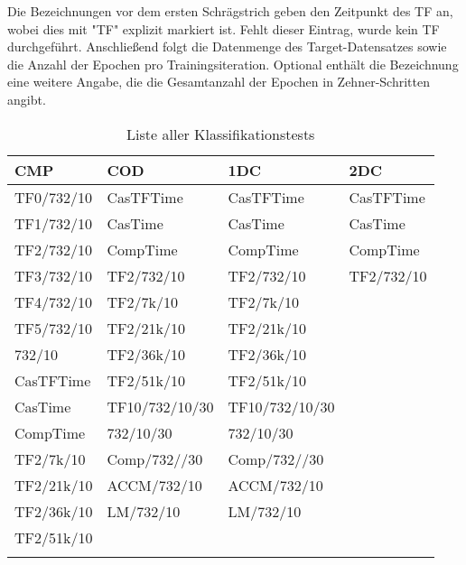 Die Bezeichnungen vor dem ersten Schrägstrich geben den Zeitpunkt des TF an, wobei dies mit "TF" explizit markiert ist. Fehlt dieser 
Eintrag, wurde kein TF durchgeführt. Anschließend folgt die Datenmenge des Target-Datensatzes sowie die Anzahl der Epochen pro 
Trainingsiteration. Optional enthält die Bezeichnung eine weitere Angabe, die die Gesamtanzahl der Epochen in Zehner-Schritten angibt.

\begin{table}[!ht]
    \centering
    \begin{tabular}{l|l|l|l}
        \textbf{CMP} & \textbf{COD} & \textbf{1DC} & \textbf{2DC} \\
        \hline
        TF0/732/10 & CasTFTime & CasTFTime & CasTFTime \\
        TF1/732/10 & CasTime & CasTime & CasTime \\
        TF2/732/10 & CompTime & CompTime & CompTime \\
        TF3/732/10 & TF2/732/10 & TF2/732/10 & TF2/732/10 \\
        TF4/732/10 & TF2/7k/10 & TF2/7k/10 & \\
        TF5/732/10 & TF2/21k/10 & TF2/21k/10 & \\
        732/10 & TF2/36k/10 & TF2/36k/10 & \\
        CasTFTime & TF2/51k/10 & TF2/51k/10 & \\
        CasTime & TF10/732/10/30 & TF10/732/10/30 & \\
        CompTime & 732/10/30 & 732/10/30 & \\
        TF2/7k/10 & Comp/732//30 & Comp/732//30 & \\
        TF2/21k/10 & ACCM/732/10 & ACCM/732/10 & \\
        TF2/36k/10 & LM/732/10 & LM/732/10 & \\
        TF2/51k/10 & & & \\
        & & & \\
    \end{tabular}
    \caption{\label{tab:classtests} Liste aller Klassifikationstests}
\end{table}

